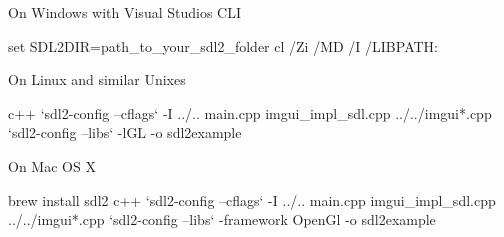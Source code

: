 
\begin{DoxyItemize}
\item On Windows with Visual Studio\textquotesingle{}s C\+LI
\end{DoxyItemize}


\begin{DoxyCode}
set SDL2DIR=path\_to\_your\_sdl2\_folder
cl /Zi /MD /I %
       /LIBPATH:%
\end{DoxyCode}



\begin{DoxyItemize}
\item On Linux and similar Unixes
\end{DoxyItemize}


\begin{DoxyCode}
c++ `sdl2-config --cflags` -I ../.. main.cpp imgui\_impl\_sdl.cpp ../../imgui*.cpp `sdl2-config --libs` -lGL
       -o sdl2example
\end{DoxyCode}



\begin{DoxyItemize}
\item On Mac OS X
\end{DoxyItemize}


\begin{DoxyCode}
brew install sdl2
c++ `sdl2-config --cflags` -I ../.. main.cpp imgui\_impl\_sdl.cpp ../../imgui*.cpp `sdl2-config --libs`
       -framework OpenGl -o sdl2example
\end{DoxyCode}
 